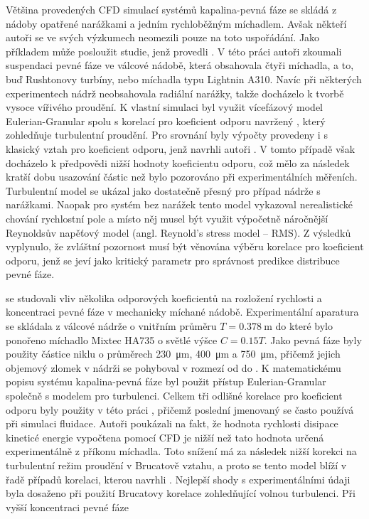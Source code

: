 Většina provedených CFD simulací systémů kapalina-pevná fáze se skládá z nádoby opatřené narážkami a jedním rychloběžným míchadlem. Avšak někteří autoři se ve svých výzkumech neomezili pouze na toto uspořádání. Jako příkladem může posloužit studie, jenž provedli \citet{mon04}. V této práci autoři zkoumali suspendaci pevné fáze ve válcové nádobě, která obsahovala čtyři míchadla, a to, buď Rushtonovy turbíny, nebo míchadla typu Lightnin A310. Navíc při některých experimentech nádrž neobsahovala radiální narážky, takže docházelo k tvorbě vysoce vířivého proudění. K vlastní simulaci byl využit vícefázový model Eulerian-Granular spolu s korelací pro koeficient odporu navržený \citet{pin01}, který zohledňuje turbulentní proudění. Pro srovnání byly výpočty provedeny i s klasický vztah pro koeficient odporu, jenž navrhli autoři \citet{schi32}. V tomto případě však docházelo k předpovědi nižší hodnoty koeficientu odporu, což mělo za následek kratší dobu usazování částic než bylo pozorováno při experimentálních měřeních. Turbulentní model \keps{} se ukázal jako dostatečně přesný pro případ nádrže s narážkami. Naopak pro systém bez narážek tento model vykazoval nerealistické chování rychlostní pole a místo něj musel být využit výpočetně náročnější Reynoldsův napěťový model (angl. Reynold's stress model -- RMS). Z výsledků vyplynulo, že zvláštní pozornost musí být věnována výběru korelace pro koeficient odporu, jenž se jeví jako kritický parametr pro správnost predikce distribuce pevné fáze.   

\citet{ochi08} se studovali vliv několika odporových koeficientů na rozložení rychlosti a koncentraci pevné fáze v mechanicky míchané nádobě. Experimentální aparatura se skládala z válcové nádrže o vnitřním průměru $T=\SI{0.378}{\meter}$ do které bylo ponořeno míchadlo Mixtec HA735 o světlé výšce $C=\num{0.15}T$. Jako pevná fáze byly použity částice niklu o průměrech \SI{230}{\micro\meter}, \SI{400}{\micro\meter} a \SI{750}{\micro\meter}, přičemž jejich objemový zlomek v nádrži se pohyboval v rozmezí od  do . K matematickému popisu systému kapalina-pevná fáze byl použit přístup Eulerian-Granular společně s modelem \keps{} pro turbulenci. Celkem tři odlišné korelace pro koeficient odporu byly použity v této práci \citep{schi32, bru98, gid94}, přičemž poslední jmenovaný se často používá při simulaci fluidace. Autoři poukázali na fakt, že hodnota rychlosti disipace kineticé energie vypočtena pomocí CFD je nižší než tato hodnota určená experimentálně z příkonu míchadla. Toto snížení má za následek nižší korekci na turbulentní režim proudění v Brucatově vztahu, a proto se tento model blíží v řadě případů korelaci, kterou navrhli \citet{schi32}. Nejlepší shody s experimentálními údaji byla dosaženo při použití Brucatovy korelace zohledňující volnou turbulenci. Při vyšší koncentraci pevné fáze  

   